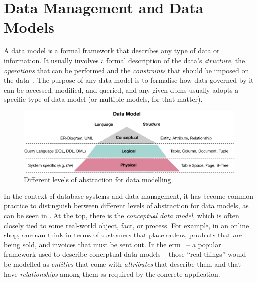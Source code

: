 \section{Data Management and Data Models}

\label{section:data_model}

A data model is a formal framework that describes any type of data or information. It usually involves a formal description of the data's \emph{structure}, the \emph{operations} that can be performed and the \emph{constraints} that should be imposed on the data~\cite{Garcia:2009Database}. The purpose of any data model is to formalise how data governed by it can be accessed, modified, and queried, and any given \acrshort{dbms} usually adopts a specific type of data model (or multiple models, for that matter).


\begin{figure}[b]
    \centering
    \includegraphics[width=\textwidth]{figures/datamodel_hierarchy.eps}
    \caption{Different levels of abstraction for data modelling.}
    \label{figure:datamodel_hierarchy}
\end{figure}

In the context of database systems and data management, it has become common practice to distinguish between different levels of abstraction for data models, as can be seen in . At the top, there is the \emph{conceptual data model}, which is often closely tied to some real-world object, fact, or process. For example, in an online shop, one can think in terms of customers that place orders, products that are being sold, and invoices that must be sent out. In the \acrfull{erm}~\cite{Chen:1976The} -- a popular framework used to describe conceptual data models -- those ``real things'' would be modelled as \emph{entities} that come with \emph{attributes} that describe them and that have \emph{relationships} among them as required by the concrete application.

